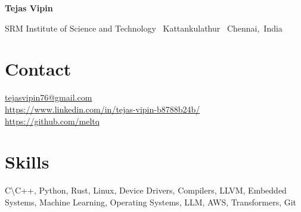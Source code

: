 \documentclass{OpenCV}
\newlength{\hvspace}
\begin{document}
\begin{center}
    \noindent\textbf{\LARGE Tejas Vipin} \\
\end{center}
\vspace{\hvspace}
\hrulefill
\vspace{\hvspace}
\begin{center}
    \noindent SRM Institute of Science and Technology \textbullet\ Kattankulathur \textbullet\ Chennai,\, India \\
\end{center}
\vspace{\hvspace}
\vspace{-4pt}
\hrulefill
\vspace{-12pt}

\section*{Contact}
\faEnvelopeO\enskip \href{mailto:tejasvipin76@gmail.com}{tejasvipin76@gmail.com} \\
\faLinkedin\enskip\href{https://www.linkedin.com/in/tejas-vipin-b8788b24b/}{https://www.linkedin.com/in/tejas-vipin-b8788b24b/} \\
\faGithub\enskip\href{https://github.com/meltq}{https://github.com/meltq} \\

\section*{Skills}
C{\textbackslash}C++, Python, Rust, Linux, Device Drivers, Compilers, LLVM, Embedded Systems, Machine Learning, Operating Systems, LLM, AWS, Transformers, Git
% 









\end{document}
